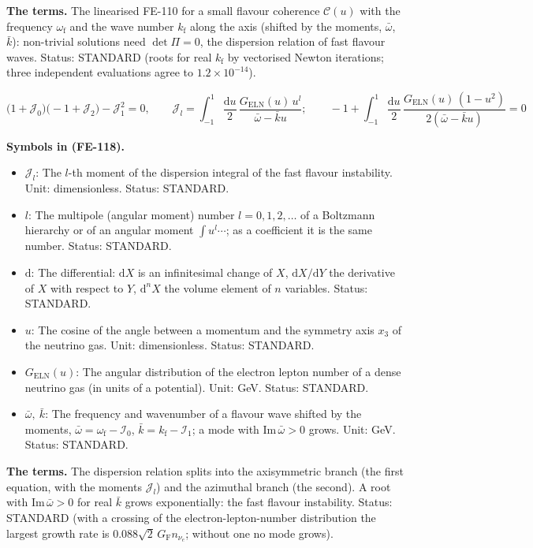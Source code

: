 \documentclass[
  10pt,
]{article}
\providecommand{\tightlist}{%
  \setlength{\itemsep}{0pt}\setlength{\parskip}{0pt}}
\begin{document}
\textbf{The terms.} The linearised FE-110 for a small flavour coherence
\(\mathcal{C}(u)\) with the frequency \(\omega_{\mathrm{f}}\) and the
wave number \(k_{\mathrm{f}}\) along the axis (shifted by the moments,
\(\bar\omega\), \(\bar k\)): non-trivial solutions need \(\det\Pi = 0\),
the dispersion relation of fast flavour waves. Status: STANDARD (roots
for real \(k_{\mathrm{f}}\) by vectorised Newton iterations; three
independent evaluations agree to \(1.2\times10^{-14}\)).

\[
\big(1 + \mathcal{J}_0\big)\big(-1 + \mathcal{J}_2\big) - \mathcal{J}_1^2 = 0,\qquad
\mathcal{J}_l = \int_{-1}^{1}\frac{\mathrm{d}u}{2}\,\frac{G_{\mathrm{ELN}}(u)\,u^l}{\bar\omega - \bar
 ku};\qquad
-1 + \int_{-1}^{1}\frac{\mathrm{d}u}{2}\,\frac{G_{\mathrm{ELN}}(u)\,(1 - u^2)}{2(\bar\omega - \bar ku)}
 = 0 \tag{FE-118}
\]

\textbf{Symbols in (FE-118).}

\begin{itemize}
\tightlist
\item
  \(\mathcal{J}_l\): The \(l\)-th moment of the dispersion integral of
  the fast flavour instability. Unit: dimensionless. Status: STANDARD.
\item
  \(l\): The multipole (angular moment) number \(l = 0, 1, 2, \dots\) of
  a Boltzmann hierarchy or of an angular moment \(\int u^l\cdots\); as a
  coefficient it is the same number. Status: STANDARD.
\item
  \(\mathrm{d}\): The differential: \(\mathrm{d}X\) is an infinitesimal
  change of \(X\), \(\mathrm{d}X/\mathrm{d}Y\) the derivative of \(X\)
  with respect to \(Y\), \(\mathrm{d}^nX\) the volume element of \(n\)
  variables. Status: STANDARD.
\item
  \(u\): The cosine of the angle between a momentum and the symmetry
  axis \(x_3\) of the neutrino gas. Unit: dimensionless. Status:
  STANDARD.
\item
  \(G_{\mathrm{ELN}}(u)\): The angular distribution of the electron
  lepton number of a dense neutrino gas (in units of a potential). Unit:
  GeV. Status: STANDARD.
\item
  \(\bar\omega,\ \bar k\): The frequency and wavenumber of a flavour
  wave shifted by the moments,
  \(\bar\omega = \omega_{\mathrm{f}} - \mathcal{I}_0\),
  \(\bar k = k_{\mathrm{f}} - \mathcal{I}_1\); a mode with
  \(\mathrm{Im}\,\bar\omega > 0\) grows. Unit: GeV. Status: STANDARD.
\end{itemize}

\textbf{The terms.} The dispersion relation splits into the axisymmetric
branch (the first equation, with the moments \(\mathcal{J}_l\)) and the
azimuthal branch (the second). A root with
\(\mathrm{Im}\,\bar\omega > 0\) for real \(\bar k\) grows exponentially:
the fast flavour instability. Status: STANDARD (with a crossing of the
electron-lepton-number distribution the largest growth rate is
\(0.088\sqrt2\,G_{\mathrm{F}}n_{\nu_e}\); without one no mode grows).
\end{document}
